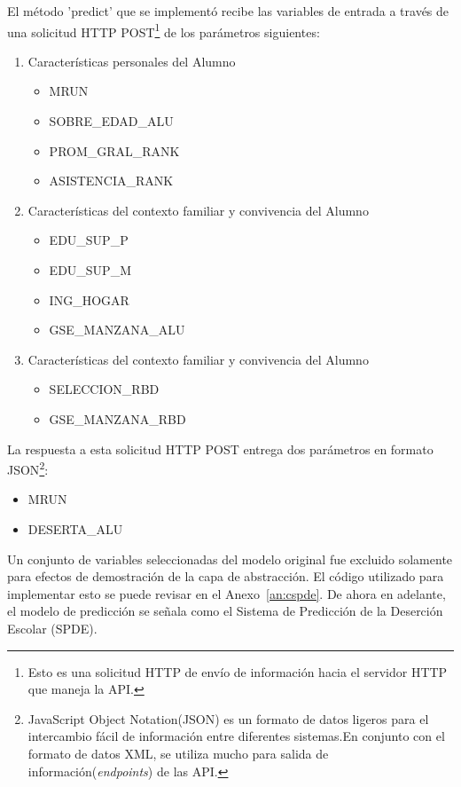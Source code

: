 El método 'predict' que se implementó recibe las variables de entrada a través de una solicitud HTTP POST\footnote{Esto es una solicitud HTTP de envío de información hacia el servidor HTTP que maneja la API.} de los parámetros siguientes:
\begin{enumerate}
\item Características personales del Alumno
    \begin{itemize}
    \item MRUN
    \item SOBRE_EDAD_ALU
    \item PROM_GRAL_RANK
    \item ASISTENCIA_RANK
    \end{itemize}
\item Características del contexto familiar y convivencia del Alumno
    \begin{itemize}
    \item EDU_SUP_P
    \item EDU_SUP_M
    \item ING_HOGAR
    \item GSE_MANZANA_ALU
    \end{itemize}
\item Características del contexto familiar y convivencia del Alumno
    \begin{itemize}
    \item SELECCION_RBD
    \item GSE_MANZANA_RBD
    \end{itemize}
\end{enumerate}

La respuesta a esta solicitud HTTP POST entrega dos parámetros en formato JSON\footnote{JavaScript Object Notation(JSON) es un formato de datos ligeros para el intercambio fácil de información entre diferentes sistemas.En conjunto con el formato de datos XML, se utiliza mucho para salida de información(\textit{endpoints}) de las API.}:
\begin{itemize}
\item MRUN
\item DESERTA_ALU
\end{itemize}

Un conjunto de variables seleccionadas del modelo original fue excluido solamente para efectos de demostración de la capa de abstracción. El código utilizado para implementar esto se puede revisar en el Anexo~\ref{an:cspde}. De ahora en adelante, el modelo de predicción se señala como el Sistema de Predicción de la Deserción Escolar (SPDE).

